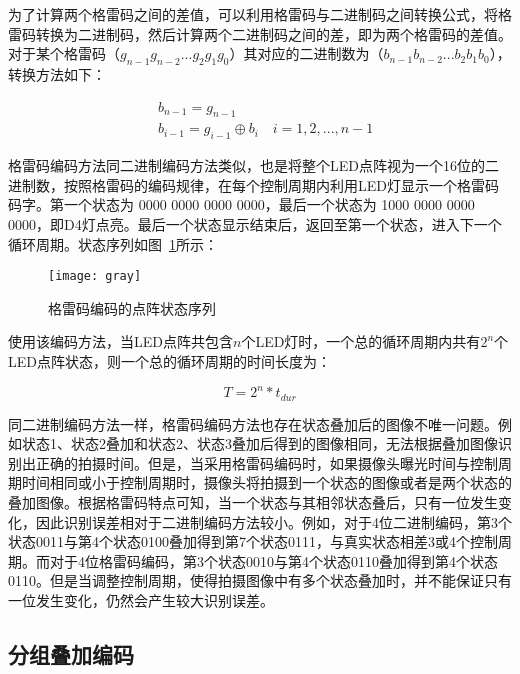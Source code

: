 为了计算两个格雷码之间的差值，可以利用格雷码与二进制码之间转换公式，将格雷码转换为二进制码，然后计算两个二进制码之间的差，即为两个格雷码的差值。对于某个格雷码（$g_{n-1}g_{n-2}...g_2g_1g_0$）其对应的二进制数为（$b_{n-1}b_{n-2}...b_2b_1b_0$），转换方法如下：

\begin{equation}
\begin{split}
&b_{n-1} = g_{n-1} \\
&b_{i-1} = g_{i-1} \oplus b_{i} \quad i = 1, 2, ..., n-1
\end{split}
  \label{flowE}
\end{equation}

格雷码编码方法同二进制编码方法类似，也是将整个LED点阵视为一个16位的二进制数，按照格雷码的编码规律，在每个控制周期内利用LED灯显示一个格雷码码字。第一个状态为 0000 0000 0000 0000，最后一个状态为 1000 0000 0000 0000，即D4灯点亮。最后一个状态显示结束后，返回至第一个状态，进入下一个循环周期。状态序列如图~\ref{gray}所示：

\begin{figure}[h] 
  \centering
  \texttt{[image: gray]}
  \caption{格雷码编码的点阵状态序列}
  \label{gray}
\end{figure}

使用该编码方法，当LED点阵共包含$n$个LED灯时，一个总的循环周期内共有$2^n$个LED点阵状态，则一个总的循环周期的时间长度为：

\begin{equation}
T = 2^n * t_{dur}
\end{equation}

同二进制编码方法一样，格雷码编码方法也存在状态叠加后的图像不唯一问题。例如状态1、状态2叠加和状态2、状态3叠加后得到的图像相同，无法根据叠加图像识别出正确的拍摄时间。但是，当采用格雷码编码时，如果摄像头曝光时间与控制周期时间相同或小于控制周期时，摄像头将拍摄到一个状态的图像或者是两个状态的叠加图像。根据格雷码特点可知，当一个状态与其相邻状态叠后，只有一位发生变化，因此识别误差相对于二进制编码方法较小。例如，对于4位二进制编码，第3个状态0011与第4个状态0100叠加得到第7个状态0111，与真实状态相差3或4个控制周期。而对于4位格雷码编码，第3个状态0010与第4个状态0110叠加得到第4个状态0110。但是当调整控制周期，使得拍摄图像中有多个状态叠加时，并不能保证只有一位发生变化，仍然会产生较大识别误差。

\subsection{分组叠加编码}

